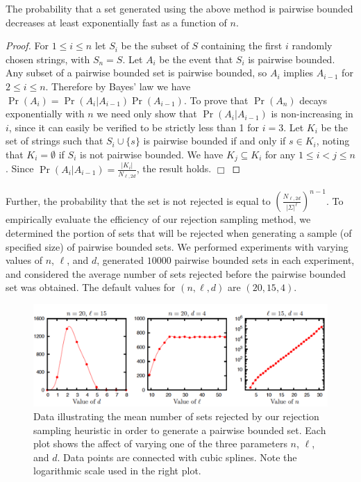 \begin{proposition} The probability that a set generated using the above method is pairwise bounded decreases at least exponentially fast as a function of $n$. \end{proposition}
\begin{proof}
For $1\leq i\leq n$ let $S_i$ be the subset of $S$ containing the first $i$ randomly chosen strings, with $S_n=S$.  Let $A_i$ be the event that $S_i$ is pairwise bounded.  Any subset of a pairwise bounded set is pairwise bounded, so $A_i$ implies $A_{i-1}$ for $2\leq i\leq n$.  Therefore by Bayes' law we have $\Pr(A_i)=\Pr(A_i|A_{i-1})\Pr(A_{i-1})$.  To prove that $\Pr(A_n)$ decays exponentially with $n$ we need only show that $\Pr(A_i | A_{i-1})$ is non-increasing in $i$, since it can easily be verified to be strictly less than 1 for $i=3$.  Let $K_i$ be the set of strings such that $S_i\cup\{s\}$ is pairwise bounded if and only if $s\in K_i$, noting that $K_i = \emptyset$ if $S_i$ is not pairwise bounded.  We have $K_j\subseteq K_i$ for any $1\leq i<j\leq n$.  Since $\Pr(A_i | A_{i-1}) = \frac{|K_i|}{N_{\ell, 2d}}$, the result holds. \hfill $\Box$ \end{proof}

Further, the probability that the set is not rejected is equal to $\left( \frac{N_{\ell, 2d}}{|\Sigma|^{\ell}}\right)^{n - 1}$.  To empirically evaluate the efficiency of our rejection sampling method, we determined the portion of sets that will be rejected when generating a sample (of specified size) of pairwise bounded sets.  We performed experiments with varying values of $n$, $\ell$, and $d$, generated $10000$ pairwise bounded sets in each experiment, and considered the average number of sets rejected before the pairwise bounded set was obtained.  The default values for $(n,\ell,d)$ are $(20,15,4)$. 


\begin{figure}[h]
\begin{center} 
 \includegraphics[width=\linewidth]{images/temp}
\caption[Data illustrating the mean number of sets rejected by our rejection sampling heuristic in order to generate a pairwise bounded set.]{Data illustrating the mean number of sets rejected by our rejection sampling heuristic in order to generate a pairwise bounded set. Each plot shows the affect of varying one of the three parameters $n$, $\ell$, and $d$.  Data points are connected with cubic splines.  Note the logarithmic scale used in the right plot.}
\label{fig:separation}
\end{center}
\end{figure}

